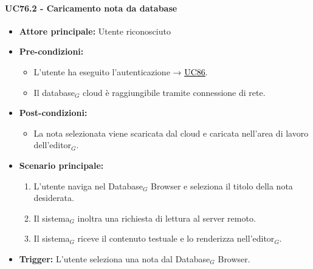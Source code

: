 \documentclass[a4paper, 10pt]{article}
\newcommand{\uclink}[2]{\hyperlink{#1}{\textcolor{black}{\underline{#2}}}}
\begin{document}
\paragraph{UC76.2 - Caricamento nota da database}
\hypertarget{uc:76.2}{}
\begin{itemize}
    \item \textbf{Attore principale:} Utente riconosciuto
    \item \textbf{Pre-condizioni:} 
        \begin{itemize}
            \item L'utente ha eseguito l'autenticazione → \uclink{uc:86}{UC86}.
            \item Il database$_G$ cloud è raggiungibile tramite connessione di rete.
        \end{itemize}
    \item \textbf{Post-condizioni:} 
        \begin{itemize}
            \item La nota selezionata viene scaricata dal cloud e caricata nell'area di lavoro dell'editor$_G$.
        \end{itemize}
    \item \textbf{Scenario principale:}
        \begin{enumerate}
            \item L'utente naviga nel Database$_G$ Browser e seleziona il titolo della nota desiderata.
            \item Il sistema$_G$ inoltra una richiesta di lettura al server remoto.
            \item Il sistema$_G$ riceve il contenuto testuale e lo renderizza nell'editor$_G$.
        \end{enumerate}
    \item \textbf{Trigger:} L'utente seleziona una nota dal Database$_G$ Browser.
\end{itemize}
\end{document}
